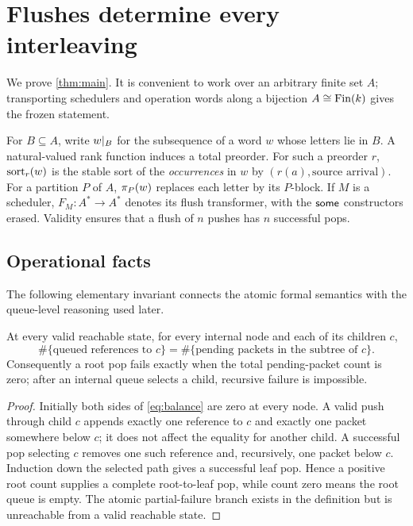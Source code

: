 \section{Flushes determine every interleaving}
\label{sec:main-proof}

We prove \autoref{thm:main}.  It is convenient to work over an arbitrary finite
set \(A\); transporting schedulers and operation words along a bijection
\(A\cong\operatorname{Fin}(k)\) gives the frozen statement.

For \(B\subseteq A\), write \(w\mathord{|}_{B}\) for the subsequence of a word
\(w\) whose letters lie in \(B\).  A natural-valued rank function induces a
total preorder.  For such a preorder \(r\), \(\operatorname{sort}_r(w)\) is the stable sort
of the \emph{occurrences} in \(w\) by
\((r(a),\text{source arrival})\).  For a partition \(P\) of \(A\),
\(\pi_{P}(w)\) replaces each letter by its \(P\)-block.  If \(M\) is a
scheduler, \(F_M:A^*\to A^*\) denotes its flush transformer, with the
\(\mathsf{some}\) constructors erased.  Validity ensures that a flush of \(n\) pushes
has \(n\) successful pops.

\subsection{Operational facts}

The following elementary invariant connects the atomic formal semantics with
the queue-level reasoning used later.

\begin{lemma}
\label{lem:balance}
At every valid reachable state, for every internal node and each of its
children \(c\),
\begin{equation}
 \#\{\text{queued references to }c\}
 =
 \#\{\text{pending packets in the subtree of }c\}.
 \label{eq:balance}
\end{equation}
Consequently a root pop fails exactly when the total pending-packet count is
zero; after an internal queue selects a child, recursive failure is impossible.
\end{lemma}

\begin{proof}
Initially both sides of \autoref{eq:balance} are zero at every node.  A valid
push through child \(c\) appends exactly one reference to \(c\) and exactly one
packet somewhere below \(c\); it does not affect the equality for another
child.  A successful pop selecting \(c\) removes one such reference and,
recursively, one packet below \(c\).  Induction down the selected path gives a
successful leaf pop.  Hence a positive root count supplies a complete
root-to-leaf pop, while count zero means the root queue is empty.  The atomic
partial-failure branch exists in the definition but is unreachable from a
valid reachable state.
\end{proof}


